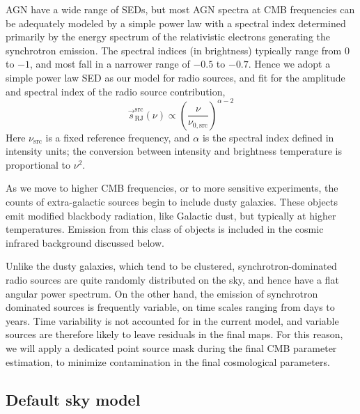 \documentclass[onecolumn]{aa}
\newcommand{\s}[0]{\vec{s}}
\begin{document}
AGN have a wide range
of SEDs, but most AGN spectra at CMB frequencies can be adequately
modeled by a simple power law with a spectral index determined primarily
by the energy spectrum of the relativistic electrons generating the
synchrotron emission. The spectral indices (in brightness) typically
range from 0 to $-1$, and most fall in a narrower range of $-0.5$ to $-0.7$.
Hence we adopt a simple power law SED as our model for radio sources,
and fit for the amplitude and spectral index of the radio source
contribution, 
\begin{equation}
\s^{\mathrm{src}}_{\mathrm{RJ}}(\nu) \propto \left(\frac{\nu}{\nu_{0,\mathrm{src}}} \right)^{\alpha-2}
\label{eq:ptsrc}
\end{equation}
Here $\nu_{\mathrm{src}}$ is a fixed reference frequency, and $\alpha$
is the spectral index defined in intensity units; the conversion
between intensity and brightness temperature is proportional to
$\nu^2$. 

As we move to higher CMB frequencies, or to more sensitive
experiments, the counts of extra-galactic sources begin to include dusty
galaxies.  These objects emit modified blackbody radiation, like
Galactic dust, but typically at higher temperatures. Emission from
this class of objects is included in the cosmic infrared background
discussed below.

Unlike the dusty galaxies, which tend to be clustered, synchrotron-dominated
radio sources are quite randomly distributed on the sky, and hence have a flat 
angular power spectrum. On the other hand, the emission of synchrotron dominated 
sources is frequently variable, on time scales ranging from days to
years. Time variability is not accounted for in the current model, and
variable sources are therefore likely to leave residuals in the final
maps. For this reason, we will apply a dedicated point source mask
during the final CMB parameter estimation, to minimize contamination
in the final cosmological parameters.

\subsection{Default sky model}
\label{sec:default_sky_model}
\end{document}
